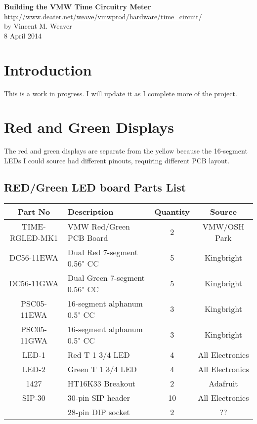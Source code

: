 \documentclass[11pt]{article}
\begin{document}
\begin{center}
{\Large \bf Building the VMW Time Circuitry Meter}\\
\url{http://www.deater.net/weave/vmwprod/hardware/time_circuit/}\\
by Vincent M. Weaver\\
8 April 2014
\end{center}


\section{Introduction}

This is a work in progress.  I will update it as I complete more
of the project.


\pagebreak
\section{Red and Green Displays}

The red and green displays are separate from the yellow because
the 16-segment LEDs I could source had different pinouts, requiring
different PCB layout.

\subsection{RED/Green LED board Parts List}

\begin{tabular}{|c|l|c|c|}
\hline
Part No   &  Description    &  Quantity    &   Source \\
\hline
\hline
TIME-RGLED-MK1 & VMW Red/Green PCB Board       & 2 & VMW/OSH Park\\ %
\hline
DC56-11EWA     & Dual Red 7-segment 0.56" CC   & 5 & Kingbright\\ %
\hline
DC56-11GWA     & Dual Green 7-segment 0.56" CC & 5 & Kingbright\\ %
\hline
PSC05-11EWA    & 16-segment alphanum 0.5" CC   & 3 & Kingbright\\ %
\hline
PSC05-11GWA    & 16-segment alphanum 0.5" CC   & 3 & Kingbright\\ %
\hline
LED-1          & Red T 1 3/4 LED               & 4 & All Electronics\\ %
\hline
LED-2          & Green T 1 3/4 LED             & 4 & All Electronics\\ %
\hline
1427           & HT16K33 Breakout              & 2 & Adafruit\\ %
\hline
SIP-30	       & 30-pin SIP header             & 10 & All Electronics\\ %
\hline
               & 28-pin DIP socket             & 2 & ?? \\ %
\hline
\end{tabular}
\end{document}
